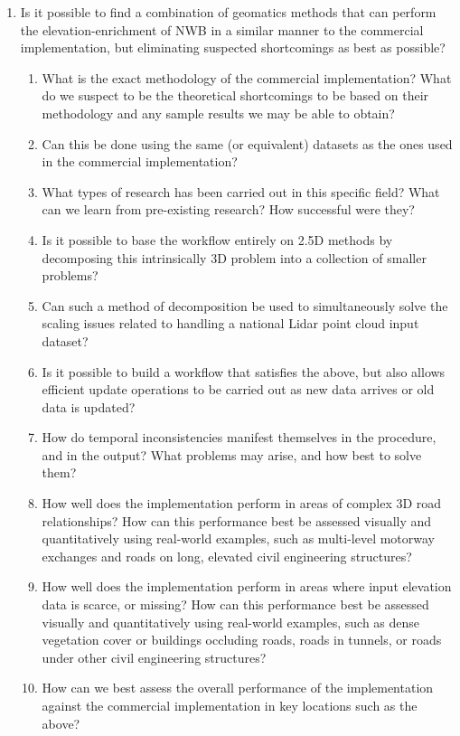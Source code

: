 \begin{enumerate}
    \item Is it possible to find a combination of geomatics methods that can perform the elevation-enrichment of NWB in a similar manner to the commercial implementation, but eliminating suspected shortcomings as best as possible?
    \begin{enumerate}
        \item What is the exact methodology of the commercial implementation? What do we suspect to be the theoretical shortcomings to be based on their methodology and any sample results we may be able to obtain?
        \item Can this be done using the same (or equivalent) datasets as the ones used in the commercial implementation?
        \item What types of research has been carried out in this specific field? What can we learn from pre-existing research? How successful were they?
        \item Is it possible to base the workflow entirely on 2.5D methods by decomposing this intrinsically 3D problem into a collection of smaller problems?
        \item Can such a method of decomposition be used to simultaneously solve the scaling issues related to handling a national Lidar point cloud input dataset?
        \item Is it possible to build a workflow that satisfies the above, but also allows efficient update operations to be carried out as new data arrives or old data is updated?
        \item How do temporal inconsistencies manifest themselves in the procedure, and in the output? What problems may arise, and how best to solve them?
        \item How well does the implementation perform in areas of complex 3D road relationships? How can this performance best be assessed visually and quantitatively using real-world examples, such as multi-level motorway exchanges and roads on long, elevated civil engineering structures?
        \item How well does the implementation perform in areas where input elevation data is scarce, or missing? How can this performance best be assessed visually and quantitatively using real-world examples, such as dense vegetation cover or buildings occluding roads, roads in tunnels, or roads under other civil engineering structures?
        \item How can we best assess the overall performance of the implementation against the commercial implementation in key locations such as the above?

\end{enumerate}
\end{enumerate}
